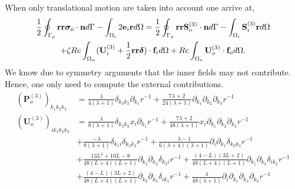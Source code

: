 When only translational motion are taken into account one arrive at,
\begin{multline}
    \frac{1}{2}\intS[p]{\textbf{rr}  \bm\sigma_{o}\cdot \textbf{n}}
    - \intO[i]{2\textbf{e}_i \textbf{r}}
    =
    \frac{1}{2}\intS[p]{\textbf{rr} \textbf{S}^{(3)}_{o}\cdot \textbf{n}}
    - \intO[i]{\textbf{S}_i^{(3)} \textbf{r}}\\
    + \zeta Re \intO{( \textbf{U}_{i}^{(3)} + \frac{1}{2} \textbf{rr}\bm\delta )\cdot \textbf{f}_{i}}
    + Re\intO[o]{\textbf{U}_{o}^{(3)}\cdot \textbf{f}_{o}}.
\end{multline}
We know due to symmetry arguments that the inner fields may not contribute.
Hence, one only need to compute the external contributions.
\begin{align*}
    (\textbf{P}_o^{(3)})_{k_1 k_2 k_3}&=
        \frac{\lambda}{4(\lambda+1)}\delta_{k_3 k_2 } \partial_{k_1} r^{-1}
        +\frac{7\lambda+2}{24(\lambda +1)} \partial_{k_1} \partial_{k_2} \partial_{k_3} r^{-1} \\
    (\textbf{U}^{(3)}_o)_{ik_1k_2k_3}
    &=
    \frac{\lambda}{8(\lambda+1)}\delta_{k_3 k_2 } x_i\partial_{k_1} r^{-1}
    + \frac{7\lambda+2}{48(\lambda +1)} x_i \partial_{k_1} \partial_{k_2} \partial_{k_3} r^{-1} \\
    &+ \frac{-\lambda}{8(\lambda+1)}\delta_{k_1 i} \delta_{k_3 k_2} r^{-1}
    + \frac{\lambda-1}{6(\lambda+4)(\lambda+1)}\partial_{i  }\partial_{k_1}\delta_{k_2 k_3} r^{-1}\\
    &+ \frac{13 L^2 + 10 L - 8}{48(L + 4)(L + 1)} \partial_{k_1}\partial_{k_2} \delta_{k_3 i} r^{-1}
    + \frac{(4 - L) (3 L + 2)}{48(L + 4)(L + 1)} \partial_{k_1}\partial_{k_3} \delta_{i k_2}r^{-1}\\
    &+ \frac{(4 - L) (3 L + 2)}{48(L + 4)(L + 1)}\partial_{k_2}\partial_{k_3} \delta_{i k_1}r^{-1}
    +\frac{\lambda}{48(\lambda+1)}\partial_{i}\partial_{k_1}\partial_{k_2}\partial_{k_3}r^{-1}
\end{align*}

